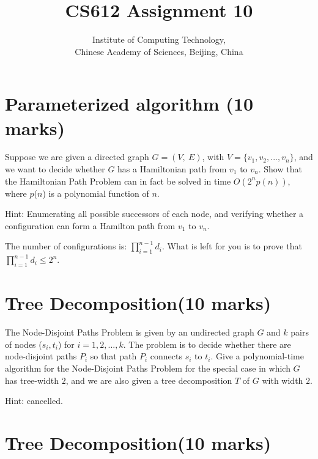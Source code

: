 \documentclass[a4paper,11pt]{article}
\title{CS612 Assignment 10}
\author{Institute of Computing Technology, \\
                       Chinese Academy of Sciences, Beijing, China }
\begin{document}
\maketitle





\section{Parameterized algorithm (10 marks)}

Suppose we are given a directed graph $G=(V,\ E)$, with $V=\{v_1,v_2,...,v_n\}$, and we want to decide whether $G$ has a Hamiltonian path from $v_1$ to $v_n$. Show that the Hamiltonian Path Problem can in fact be solved in time $O(2^np(n))$, where $p$($n$) is a polynomial function of $n$.

Hint: Enumerating all possible successors of each node, and verifying whether a configuration can form a Hamilton path from $v_1$ to $v_n$. 

The number of configurations is: $\prod_{i=1}^{n-1} d_i$. What is left for you is to prove that $\prod_{i=1}^{n-1} d_i \leq 2^n$. 


\section{Tree Decomposition(10 marks)}

The Node-Disjoint Paths Problem is given by an undirected graph $G$ and $k$ pairs of nodes ($s_i,t_i$) for $i=1,2,...,k$. The problem is to decide whether there are node-disjoint paths $P_i$ so that path $P_i$ connects $s_i$ to $t_i$. Give a polynomial-time algorithm for the Node-Disjoint Paths Problem for the special case in which $G$ has tree-width $2$, and we are also given a tree decomposition $T$ of $G$ with width $2$.

Hint: cancelled. 

%  	



\section{Tree Decomposition(10 marks)}
\end{document}
